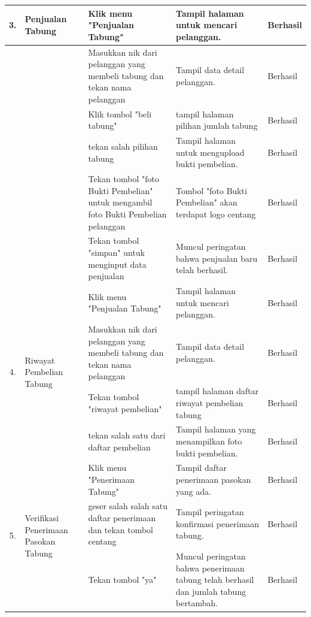 \begin{longtable}{ |c|p{3cm}|p{3cm}|p{3cm}|p{2cm}|}
		\multirow{1}{*}{3.}  & 	\multirow{1}{*}{Penjualan Tabung} & Klik menu "Penjualan Tabung"          & Tampil halaman untuk mencari pelanggan.             & Berhasil \\ \hline
		\multirow{5}{*}{} & \multirow{5}{*}{} & Masukkan nik dari pelanggan yang membeli tabung dan tekan nama pelanggan           & Tampil data detail pelanggan.             & Berhasil \\ \cline{3-5}
		& & Klik tombol "beli tabung"           & tampil halaman pilihan jumlah tabung & Berhasil
		 \\ \cline{3-5}
		& & tekan salah pilihan tabung           & Tampil halaman untuk mengupload bukti pembelian.             & Berhasil \\ \cline{3-5}
		& &  Tekan tombol "foto Bukti Pembelian" untuk mengambil foto Bukti Pembelian pelanggan        & Tombol "foto Bukti Pembelian" akan terdapat logo centang             & Berhasil \\ \cline{3-5}
		& &  Tekan tombol "simpan" untuk menginput data penjualan  & Muncul peringatan bahwa penjualan baru telah berhasil.             & Berhasil \\ \hline
		
		\multirow{4}{*}{4.}  & 	\multirow{4}{*}{\parbox{3cm}{\centering Riwayat Pembelian Tabung}} & Klik menu "Penjualan Tabung"          & Tampil halaman untuk mencari pelanggan.             & Berhasil \\ \cline{3-5}
		 & & Masukkan nik dari pelanggan yang membeli tabung dan tekan nama pelanggan           & Tampil data detail pelanggan.             & Berhasil \\ \cline{3-5}
		& & Tekan tombol "riwayat pembelian"           & tampil halaman daftar riwayat pembelian tabung & Berhasil
		\\ \hline
		& & tekan salah satu dari daftar pembelian           & Tampil halaman yang menampilkan foto bukti pembelian.             & Berhasil \\ \hline
	
		
		
		\multirow{3}{*}{5.}  & 	\multirow{3}{*}{\parbox{3cm}{\centering Verifikasi Penerimaan Pasokan Tabung}} & Klik menu "Penerimaan Tabung"           & Tampil daftar penerimaan pasokan yang ada.             & Berhasil \\ \cline{3-5}
		& & geser salah salah satu daftar penerimaan dan tekan tombol centang           & Tampil peringatan konfirmasi penerimaan tabung.             & Berhasil \\ \cline{3-5}
		& & Tekan tombol "ya"           & Muncul peringatan bahwa penerimaan tabung telah berhasil dan jumlah tabung bertambah.             & Berhasil \\ \hline
		
	\end{longtable}

